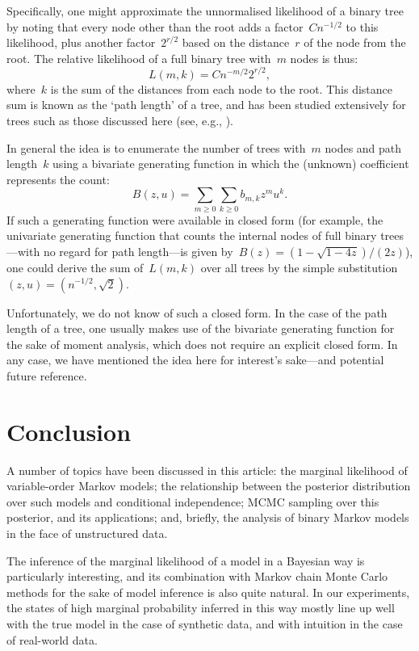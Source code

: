 \documentclass[11pt,a4paper]{article}
\begin{document}
Specifically, one might approximate the unnormalised likelihood of a binary tree
by noting that every node other than the root adds a factor~\(Cn^{-1/2}\) to
this likelihood, plus another factor~\(2^{r/2}\) based on the distance~\(r\) of
the node from the root. The relative likelihood of a full binary tree with~\(m\)
nodes is thus:
\begin{equation*}
  L(m,k) = C n^{-m/2} 2^{r/2},
\end{equation*}
where~\(k\) is the sum of the distances from each node to the root. This
distance sum is known as the `path length' of a tree, and has been studied
extensively for trees such as those discussed here (see, e.g.,
\cite[Section~3.5]{flajolet2009analytic}).

In general the idea is to enumerate the number of trees with~\(m\) nodes and
path length~\(k\) using a bivariate generating function in which the (unknown)
coefficient represents the count:
\begin{equation*}
  B(z, u) = \sum_{m\geq 0} \sum_{k\geq 0} b_{m,k} z^m u^k.
\end{equation*}
If such a generating function were available in closed form (for example, the
univariate generating function that counts the internal nodes of full binary
trees---with no regard for path length---is given by~\(B(z) = (1 - \sqrt{1 -
4z})/(2z)\)), one could derive the sum of~\(L(m, k)\) over all trees by the
simple substitution~\((z, u) = (n^{-1/2}, \sqrt{2})\).

Unfortunately, we do not know of such a closed form. In the case of the path
length of a tree, one usually makes use of the bivariate generating function for
the sake of moment analysis, which does not require an explicit closed form. In
any case, we have mentioned the idea here for interest's sake---and potential
future reference.

\section{Conclusion} %

A number of topics have been discussed in this article: the marginal likelihood
of variable-order Markov models; the relationship between the posterior
distribution over such models and conditional independence; MCMC sampling over
this posterior, and its applications; and, briefly, the analysis of binary
Markov models in the face of unstructured data.

The inference of the marginal likelihood of a model in a Bayesian way is
particularly interesting, and its combination with Markov chain Monte Carlo
methods for the sake of model inference is also quite natural. In our
experiments, the states of high marginal probability inferred in this way mostly
line up well with the true model in the case of synthetic data, and with
intuition in the case of real-world data.
\end{document}
